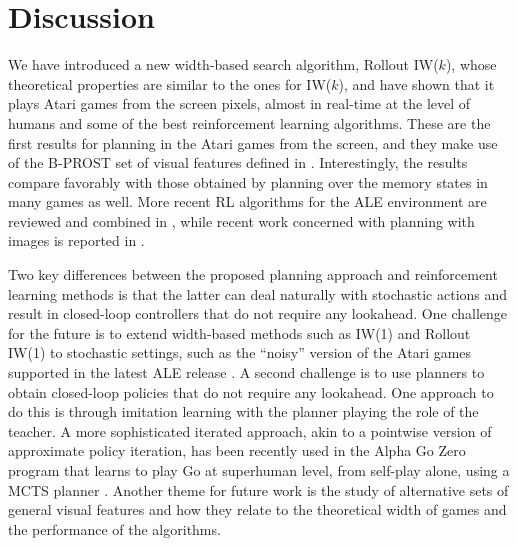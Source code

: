 \documentclass[letterpaper]{article}
\begin{document}
\section{Discussion}

We have introduced a new width-based search algorithm, Rollout IW($k$), whose
theoretical properties are similar to the ones for IW($k$), and have shown that
it plays Atari games from the screen pixels, almost in real-time at the level
of humans and some of the best reinforcement learning algorithms.
These are the first results for planning in the Atari games from the screen, and
they make use of the B-PROST set of visual features defined in \cite{shallow}.
Interestingly, the results compare favorably with those obtained by planning over
the memory states in many games as well. More recent RL algorithms for the ALE
environment are reviewed and combined in \cite{silver:rainbow}, while recent work
concerned with planning with images is reported in \cite{fukunaga:planning-images}.



Two key differences between the proposed planning approach and reinforcement learning
methods is that the latter can deal naturally with stochastic actions and result in
closed-loop controllers that do not require any lookahead.
One challenge for the future is to extend width-based methods such as IW(1) and Rollout IW(1)
to stochastic settings, such as the ``noisy'' version of the Atari games supported in the
latest ALE release \cite{machado:ale}. A second challenge is to use planners to
obtain closed-loop policies that do not require any lookahead. One approach to do this
is through imitation learning with the planner playing the role of the teacher.
A more sophisticated iterated approach, akin to a pointwise version of approximate policy iteration,
has been recently used in the Alpha Go Zero program that learns to play Go at superhuman level,
from self-play alone, using a MCTS planner \cite{alpha-zero-go}.
Another theme for future work is the study of alternative sets of general visual
features and how they relate to the theoretical width of games and the performance
of the algorithms.
\end{document}
